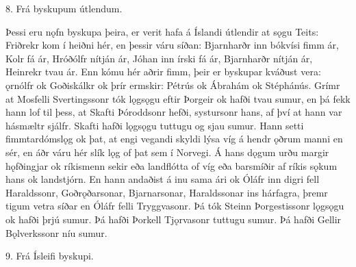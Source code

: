 8. Frá byskupum útlendum.

Þessi eru nǫfn byskupa þeira, er verit hafa á Íslandi útlendir at sǫgu Teits: Friðrekr kom í heiðni hér, en þessir váru síðan: Bjarnharðr inn bókvísi fimm ár, Kolr fá ár, Hróðólfr nítján ár, Jóhan inn írski fá ár, Bjarnharðr nítján ár, Heinrekr tvau ár.
Enn kómu hér aðrir fimm, þeir er byskupar kváðust vera: ǫrnólfr ok Goðiskálkr ok þrír ermskir: Pétrús ok Ábrahám ok Stéphánús.
Grímr at Mosfelli Svertingssonr tók lǫgsǫgu eftir Þorgeir ok hafði tvau sumur, en þá fekk hann lof til þess, at Skafti Þóroddsonr hefði, systursonr hans, af því at hann var hásmæltr sjálfr.
Skafti hafði lǫgsǫgu tuttugu og sjau sumur. Hann setti fimmtardómslǫg ok þat, at engi vegandi skyldi lýsa víg á hendr ǫðrum manni en sér, en áðr váru hér slík lǫg of þat sem í Norvegi. Á hans dǫgum urðu margir hǫfðingjar ok ríkismenn sekir eða landflótta of víg eða barsmíðir af ríkis sǫkum hans ok landstjórn. En hann andaðist á inu sama ári ok Óláfr inn digri fell Haraldssonr, Goðrǫðarsonar, Bjarnarsonar, Haraldssonar ins hárfagra, þremr tigum vetra síðar en Óláfr felli Tryggvasonr.
Þá tók Steinn Þorgestissonr lǫgsǫgu ok hafði þrjú sumur. Þá hafði Þorkell Tjǫrvasonr tuttugu sumur. Þá hafði Gellir Bǫlverkssonr níu sumur.


9. Frá Ísleifi byskupi.

